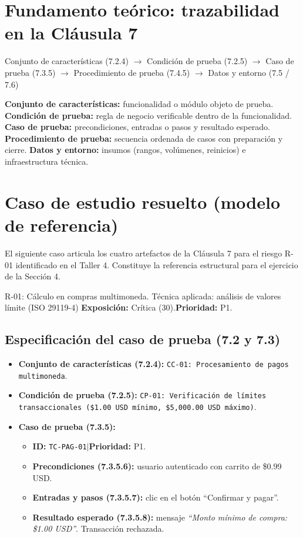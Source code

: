 \documentclass[11pt,a4paper]{article}
\newcommand{\campo}[1]{\textbf{#1}}
\begin{document}
\section{Fundamento teórico: trazabilidad en la Cláusula 7}
\begin{trazab}
Conjunto de características (7.2.4) $\rightarrow$ Condición de prueba (7.2.5) $\rightarrow$ Caso de prueba (7.3.5) $\rightarrow$ Procedimiento de prueba (7.4.5) $\rightarrow$ Datos y entorno (7.5 / 7.6)
\end{trazab}
\noindent\campo{Conjunto de características:} funcionalidad o módulo objeto de prueba.\quad
\campo{Condición de prueba:} regla de negocio verificable dentro de la funcionalidad.\quad
\campo{Caso de prueba:} precondiciones, entradas o pasos y resultado esperado.\quad
\campo{Procedimiento de prueba:} secuencia ordenada de casos con preparación y cierre.\quad
\campo{Datos y entorno:} insumos (rangos, volúmenes, reinicios) e infraestructura técnica.

\section{Caso de estudio resuelto (modelo de referencia)}
El siguiente caso articula los cuatro artefactos de la Cláusula 7 para el riesgo R-01 identificado en el Taller 4. Constituye la referencia estructural para el ejercicio de la Sección 4.

\begin{cajaacento}[fondo]{R-01: Cálculo en compras multimoneda. Técnica aplicada: análisis de valores límite (ISO 29119-4)}
\campo{Exposición:} Crítica (30).\qquad\campo{Prioridad:} P1.
\end{cajaacento}

\subsection{Especificación del caso de prueba (7.2 y 7.3)}
\begin{itemize}
\item \campo{Conjunto de características (7.2.4):} \texttt{CC-01: Procesamiento de pagos multimoneda}.
\item \campo{Condición de prueba (7.2.5):} \texttt{CP-01: Verificación de límites transaccionales (\$1.00 USD mínimo, \$5,000.00 USD máximo)}.
\item \campo{Caso de prueba (7.3.5):}
  \begin{itemize}
  \item \campo{ID:} \texttt{TC-PAG-01}\quad$|$\quad\campo{Prioridad:} P1.
  \item \campo{Precondiciones (7.3.5.6):} usuario autenticado con carrito de \$0.99 USD.
  \item \campo{Entradas y pasos (7.3.5.7):} clic en el botón ``Confirmar y pagar''.
  \item \campo{Resultado esperado (7.3.5.8):} mensaje \emph{``Monto mínimo de compra: \$1.00 USD''}. Transacción rechazada.
  \end{itemize}
\end{itemize}
\end{document}
